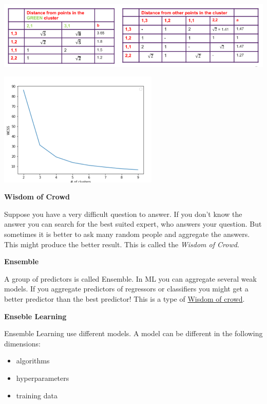 \documentclass[11pt,twoside,landscape]{article}
\begin{document}
\begin{multicols}{3}
\begin{center}
\includegraphics[width=.9\linewidth]{img/silhouette_score_a_b.png}
\end{center}

\begin{center}
\includegraphics[width=.9\linewidth]{img/elbow_method.png}
\end{center}

\textbf{Wisdom of Crowd}

Suppose you have a very difficult question to answer.
If you don't know the answer you can search for the best suited expert, who answers your question.
But sometimes it is better to ask many random people and aggregate the answers.
This might produce the better result.
This is called the \emph{Wisdom of Crowd}.

\textbf{Ensemble}

A group of predictors is called Ensemble.
In ML you can aggregate several weak models.
If you aggregate predictors of regressors or classifiers you might get a better predictor than the best predictor!
This is a type of \href{../../../roam/20211228083830-wisdom_of_crowd.org}{Wisdom of crowd}.

\textbf{Enseble Learning}

Ensemble Learning use different models.
A model can be different in the following dimensions:
\begin{itemize}
\item algorithms
\item hyperparameters
\item training data
\end{itemize}



\end{multicols}
\end{document}
